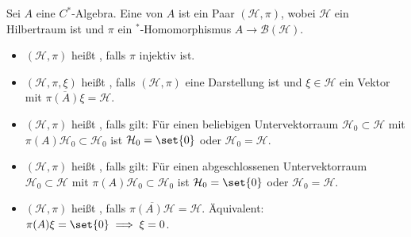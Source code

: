 \begin{definition}[{name=[Darstellung]},label=def:510]
	Sei $A$ eine $C^*$-Algebra. 
	Eine  von $A$ ist ein Paar $(\mathcal{H},\pi)$, wobei $\mathcal{H}$ ein Hilbertraum ist und $\pi$ ein $^*$-Homomorphismus $A \to \mathcal{B}(\mathcal{H})$.
	\begin{itemize}[itemsep=0pt]
		\item $(\mathcal{H},\pi)$ heißt , falls $\pi$ injektiv ist.
		\item $(\mathcal{H},\pi,\xi)$ heißt , falls $(\mathcal{H},\pi)$ eine Darstellung ist und $\xi \in \mathcal{H}$ ein Vektor mit $\overline{\pi(A) \xi}=\mathcal{H}$.
		\item $(\mathcal{H},\pi)$ heißt , falls gilt: 
		Für einen beliebigen Untervektorraum $\mathcal{H}_0 \subset \mathcal{H}$ mit ${\pi(A)\mathcal{H}_0 \subset \mathcal{H}_0}$ ist $\mathcal{H}_0=\set{0}$ oder $\mathcal{H}_0=\mathcal{H}$.
		\item $(\mathcal{H},\pi)$ heißt , falls gilt: 
		Für einen abgeschlossenen Untervektorraum $\mathcal{H}_0 \subset \mathcal{H}$ mit $\pi(A)\mathcal{H}_0 \subset \mathcal{H}_0$ ist $\mathcal{H}_0=\set{0}$ oder $\mathcal{H}_0=\mathcal{H}$.
		\item $(\mathcal{H},\pi)$ heißt , falls $\overline{\pi(A)\mathcal{H}}=\mathcal{H}$. Äquivalent: $\pi(A)\xi = \set{0} \implies \xi=0$.
	\end{itemize}
\end{definition}

